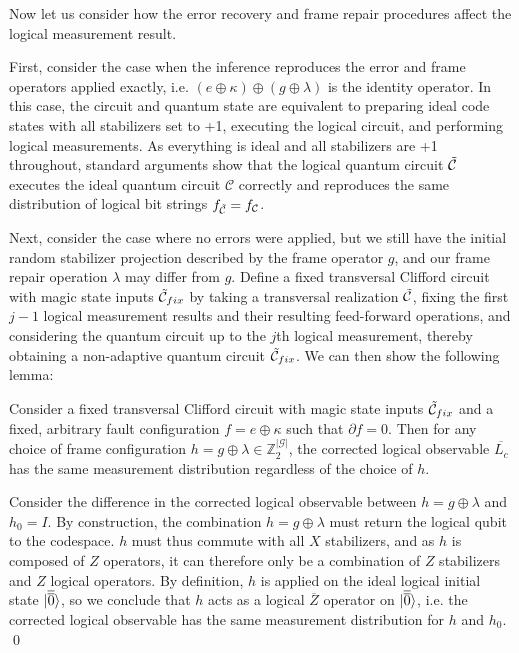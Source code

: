 Now let us consider how the error recovery and frame repair procedures affect the logical measurement result.

First, consider the case when the inference reproduces the error and frame operators applied exactly, i.e. $(e\oplus\kappa)\oplus(g\oplus\lambda)$ is the identity operator.
%
In this case, the circuit and quantum state are equivalent to preparing ideal code states with all stabilizers set to +1, executing the logical circuit, and performing logical measurements.
%
As everything is ideal and all stabilizers are +1 throughout, standard arguments show that the logical quantum circuit $\tilde{\mathcal{C}}$ executes the ideal quantum circuit $\mathcal{C}$ correctly and reproduces the same distribution of logical bit strings $f_{\tilde{\mathcal{C}}}=f_{\mathcal{C}}$.

Next, consider the case where no errors were applied, but we still have the initial random stabilizer projection described by the frame operator $g$, and our frame repair operation $\lambda$ may differ from $g$.
%
Define a fixed transversal Clifford circuit with magic state inputs $\tilde{\mathcal{C}}_{fix}$ by taking a transversal realization $\tilde{\mathcal{C}}$, fixing the first $j-1$ logical measurement results and their resulting feed-forward operations, and considering the quantum circuit up to the $j$th logical measurement, thereby obtaining a non-adaptive quantum circuit $\tilde{\mathcal{C}}_{fix}$.
%
We can then show the following lemma:

\begin{lemma}
\label{lemma:frame_trivial}
Consider a fixed transversal Clifford circuit with magic state inputs $\tilde{\mathcal{C}}_{fix}$ and a fixed, arbitrary fault configuration $f=e\oplus\kappa$ such that $\partial f=0$.
%
Then for any choice of frame configuration $h=g\oplus\lambda\in \mathbb{Z}_2^{|\mathcal{G}|}$, the corrected logical observable $\overline{L_c}$ has the same measurement distribution regardless of the choice of $h$.
\end{lemma}

Consider the difference in the corrected logical observable between $h=g\oplus\lambda$ and $h_0=I$.
%
By construction, the combination $h=g\oplus\lambda$ must return the logical qubit to the codespace.
%
$h$ must thus commute with all $X$ stabilizers, and as $h$ is composed of $Z$ operators, it can therefore only be a combination of $Z$ stabilizers and $Z$ logical operators.
%
By definition, $h$ is applied on the ideal logical initial state $|\overline{\overline{0}}\rangle$, so we conclude that $h$ acts as a logical $\overline{Z}$ operator on $|\overline{\overline{0}}\rangle$, i.e. the corrected logical observable has the same measurement distribution for $h$ and $h_0$.
\qed

